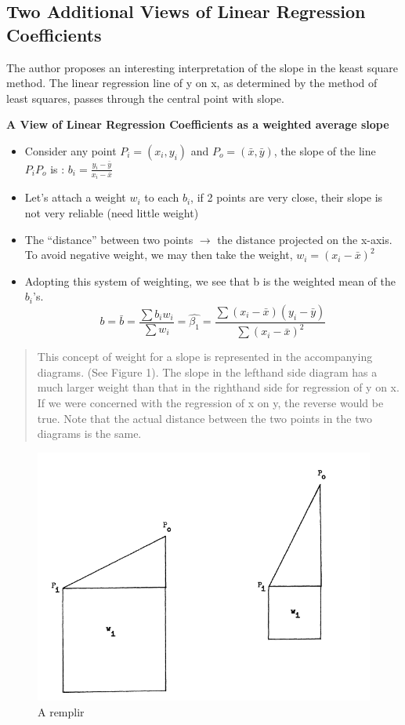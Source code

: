\documentclass[
]{report}
\providecommand{\tightlist}{%
  \setlength{\itemsep}{0pt}\setlength{\parskip}{0pt}}
\begin{document}
\hypertarget{two-additional-views-of-linear-regression-coefficients}{%
\subsection{Two Additional Views of Linear Regression Coefficients}\label{two-additional-views-of-linear-regression-coefficients}}

The author \citep{Cli} proposes an interesting interpretation of the slope in the keast square method. The linear regression line of y on x, as determined by the method of least squares, passes through the central point with slope.

\textbf{A View of Linear Regression Coefficients as a weighted average slope}

\begin{itemize}
\tightlist
\item
  Consider any point \(P_i=(x_i,y_i)\) and \(P_o=(\bar{x}, \bar{y})\), the slope of the line \(P_i P_o\) is : \(b_i=\frac{y_i -\bar{y}}{x_i-\bar{x}}\)
\item
  Let's attach a weight \(w_i\) to each \(b_i\), if 2 points are very close, their slope is not very reliable (need little weight)
\item
  The ``distance'' between two points \(\to\) the distance projected on the x-axis. To avoid negative weight, we may then take the weight, \(w_i=(x_i-\bar{x})^2\)
\item
  Adopting this system of weighting, we see that b is the weighted mean of the \(b_i\)'s.
  \begin{equation}
                    b=\bar{b}=\frac{\sum b_i w_i}{\sum w_i} = \hat{\beta_1} = \frac{\sum(x_i -\bar{x})(y_i -\bar{y})}{\sum(x_i -\bar{x})^2}
                \end{equation}
\end{itemize}

\begin{quote}
This concept of weight for a slope is represented in the accompanying diagrams. (See Figure 1). The slope in the lefthand side diagram has a much larger weight than that in the righthand side for regression of y on x. If we were concerned with the regression of x on y, the reverse would be true. Note that the actual distance between the two points in the two diagrams is the same.
\end{quote}

\begin{figure}
    \centering
    \includegraphics[width= 250 pt]{LI_slope.PNG}
    \caption{A remplir}
\end{figure}
\end{document}
